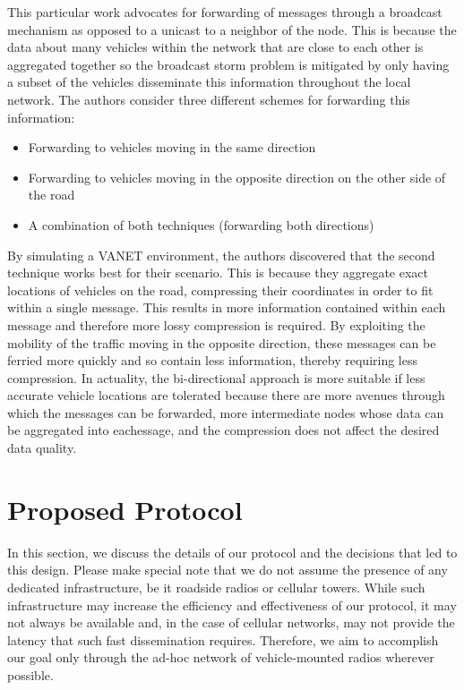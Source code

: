 \documentclass{IEEEtran}
\begin{document}
This particular work advocates for forwarding of messages through a broadcast mechanism as opposed to a unicast to a neighbor of the node.  This is because the data about many vehicles within the network that are close to each other is aggregated together so the broadcast storm problem is mitigated by only having a subset of the vehicles disseminate this information throughout the local network.  The authors consider three different schemes for forwarding this information:

\begin{itemize}
\item Forwarding to vehicles moving in the same direction
\item Forwarding to vehicles moving in the opposite direction on the other side of the road
\item A combination of both techniques (forwarding both directions)
\end{itemize}

By simulating a VANET environment,  the authors discovered that the second technique works best for their scenario.  This is because they aggregate exact locations of vehicles on the road, compressing their coordinates in order to fit within a single message.  This results in more information contained within each message and therefore more lossy compression is required.
By exploiting the mobility of the traffic moving in the opposite direction, these messages can be ferried more quickly and so contain less information, thereby requiring less compression.
In actuality, the bi-directional approach is more suitable if less accurate vehicle locations are tolerated because there are more avenues through which the messages can be forwarded, more intermediate nodes whose data can be aggregated into eachessage, and the compression does not affect the desired data quality.

\section{Proposed Protocol}

In this section, we discuss the details of our protocol and the decisions that led to this design.
Please make special note that we do not assume the presence of any dedicated infrastructure, be it roadside radios or cellular towers.
While such infrastructure may increase the efficiency and effectiveness of our protocol, it may not always be available and, in the case of cellular networks, may not provide the latency that such fast dissemination requires.
Therefore, we aim to accomplish our goal only through the ad-hoc network of vehicle-mounted radios wherever possible.
\end{document}
